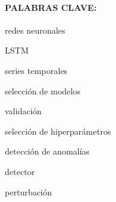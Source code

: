 \paragraph{PALABRAS CLAVE:}
\begin{itemize*}[label=,itemsep=1em,itemjoin=\hspace{1em}]
  \item redes neuronales
  \item LSTM
  \item series temporales
  \item selección de modelos
  \item validación
  \item selección de hiperparámetros
  \item detección de anomalías
  \item detector
  \item perturbación
\end{itemize*}

\endinput
